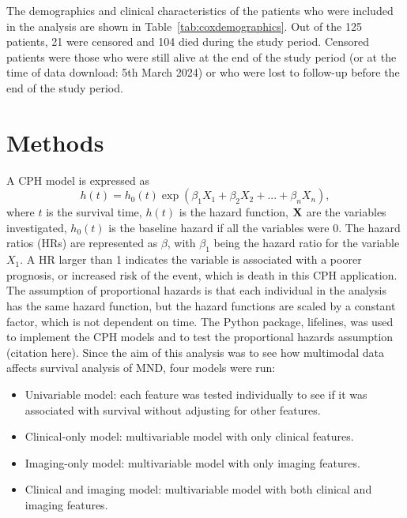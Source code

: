 The demographics and clinical characteristics of the patients who were included in the analysis are shown in Table~\ref{tab:coxdemographics}.
Out of the 125 patients, 21 were censored and 104 died during the study period.
Censored patients were those who were still alive at the end of the study period (or at the time of data download: 5th March 2024) or who were lost to follow-up before the end of the study period.

\section{Methods}

A CPH model is expressed as
\begin{equation}\label{eq:coxhazard}
    h(t) = h_0(t) \exp{(\beta_1 X_1 + \beta_2 X_2 + ... + \beta_n X_n)},
\end{equation}
where $t$ is the survival time, $h(t)$ is the hazard function, $\bold{X}$ are the variables investigated, $h_0(t)$ is the baseline hazard if all the variables were 0.
The hazard ratios (HRs) are represented as $\beta$, with $\beta_1$ being the hazard ratio for the variable $X_1$.
A HR larger than 1 indicates the variable is associated with a poorer prognosis, or increased risk of the event, which is death in this CPH application.
The assumption of proportional hazards is that each individual in the analysis has the same hazard function, but the hazard functions are scaled by a constant factor, which is not dependent on time.
The Python package, lifelines, was used to implement the CPH models and to test the proportional hazards assumption (citation here).
Since the aim of this analysis was to see how multimodal data affects survival analysis of MND, four models were run:
\begin{itemize}
\setlength\itemsep{-0.5em}
    \item Univariable model: each feature was tested individually to see if it was associated with survival without adjusting for other features.
    \item Clinical-only model: multivariable model with only clinical features.
    \item Imaging-only model: multivariable model with only imaging features.
    \item Clinical and imaging model: multivariable model with both clinical and imaging features.
\end{itemize}


